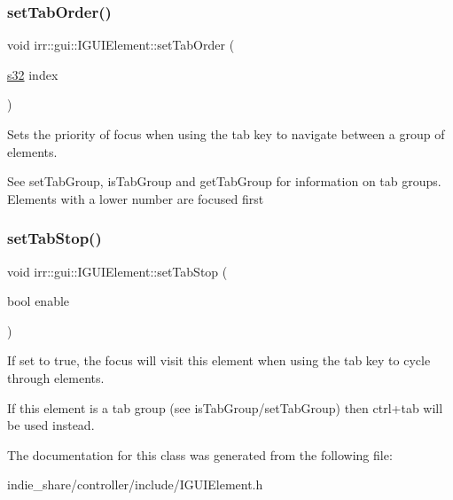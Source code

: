 \subsubsection{\texorpdfstring{set\+Tab\+Order()}{setTabOrder()}}
{\footnotesize\ttfamily void irr\+::gui\+::\+I\+G\+U\+I\+Element\+::set\+Tab\+Order (\begin{DoxyParamCaption}\item[{\hyperlink{namespaceirr_ac66849b7a6ed16e30ebede579f9b47c6}{s32}}]{index }\end{DoxyParamCaption})\hspace{0.3cm}{\ttfamily [inline]}}



Sets the priority of focus when using the tab key to navigate between a group of elements. 

See set\+Tab\+Group, is\+Tab\+Group and get\+Tab\+Group for information on tab groups. Elements with a lower number are focused first \mbox{\label{classirr_1_1gui_1_1IGUIElement_a58b9b6a8715b4959dda905dbc028ece6}} 
\subsubsection{\texorpdfstring{set\+Tab\+Stop()}{setTabStop()}}
{\footnotesize\ttfamily void irr\+::gui\+::\+I\+G\+U\+I\+Element\+::set\+Tab\+Stop (\begin{DoxyParamCaption}\item[{bool}]{enable }\end{DoxyParamCaption})\hspace{0.3cm}{\ttfamily [inline]}}



If set to true, the focus will visit this element when using the tab key to cycle through elements. 

If this element is a tab group (see is\+Tab\+Group/set\+Tab\+Group) then ctrl+tab will be used instead. 

The documentation for this class was generated from the following file\+:\begin{DoxyCompactItemize}
\item 
indie\+\_\+share/controller/include/I\+G\+U\+I\+Element.\+h\end{DoxyCompactItemize}
